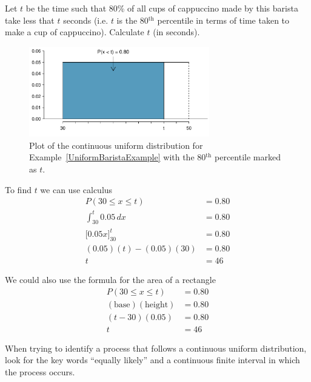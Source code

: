 \begin{example}{Let $t$ be the time such that 80\% of all cups of cappuccino made by this barista take less that $t$ seconds
(i.e. $t$ is the 80$^{\text{th}}$ percentile in terms of time taken to make a cup of cappuccino).
Calculate $t$ (in seconds).}
\vspace{-0.25cm}
\begin{figure}[H]
\centering
\includegraphics[width=0.7\textwidth]{03/figures2/barista/barista80thPercentile/uniformBarista80thPercentile.pdf}
\caption{Plot of the continuous uniform distribution for Example~\ref{UniformBaristaExample} with the 80$^{\text{th}}$ percentile marked as $t$. }
\label{uniformDistBarista80thPercentile}
\end{figure}
\vspace{-0.25cm}
To find $t$ we can use calculus
\begin{align*}
P(30 \leq x \leq t)			& = 0.80	\\[1.5mm]
\int_{30}^{t} 0.05 \, dx		& = 0.80	\\[1.5mm]
\big[ 0.05x \big]^{t}_{30}		& = 0.80	\\[1.5mm]
(0.05)(t) - (0.05)(30)			& = 0.80	\\[1.5mm]
t						& = 46
\end{align*}

We could also use the formula for the area of a rectangle
\begin{align*}
P(30 \leq x \leq t)			& = 0.80	\\[1.5mm]
(\text{base})(\text{height})		& = 0.80	\\[1.5mm]
(t-30)(0.05)				& = 0.80	\\[1.5mm]
t						& = 46
\end{align*}

\end{example}





\begin{tipBox}{
When trying to identify a process that follows a continuous uniform distribution, look for the key words
``equally likely'' and a continuous finite interval in which the process occurs.}
\end{tipBox}







